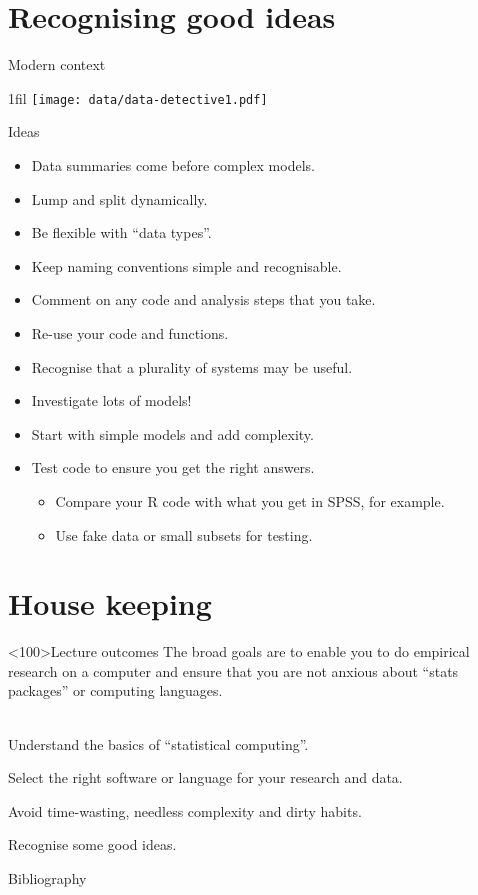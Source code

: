 \documentclass{beamer}
\makeatletter
\newcommand*{\centerfloat}{%
	\parindent \z@
	\leftskip \z@ \@plus 1fil \@minus \textwidth
	\rightskip\leftskip
	\parfillskip \z@skip}
\theoremstyle{example}
\newenvironment{bigenumerate}{\enumerate\addtolength{\itemsep}{1em}}{\endenumerate}
\newcommand{\outcomes}{	The broad goals are to enable you to do empirical research on a computer and ensure that you are not anxious about ``stats packages'' or computing languages.
	\\~\\
	\begin{bigenumerate}
		\item<+-> Understand the basics of ``statistical computing''.
		\item<+-> Select the right software or language for your research and data.
		\item<+-> Avoid time-wasting, needless complexity and dirty habits.
		\item<+-> Recognise some good ideas.
	\end{bigenumerate}
}
\makeatother
\begin{document}
	

	
	
	\section{Recognising good ideas}
	
	\begin{frame}{Modern context \citep[page 14]{spiegelhalter2019} }
		
		\centerfloat \centering	
		\texttt{[image: data/data-detective1.pdf]}
		
	\end{frame}
	
	
	\begin{frame}{Ideas}
		
		\begin{itemize}
			\item<+-> Data summaries come before complex models.
			
			\item<+-> Lump and split dynamically.  
			
			\item<+-> Be flexible with ``data types''.
			
			\item<+-> Keep naming conventions simple and recognisable.
			
			\item<+-> Comment on any code and analysis steps that you take.
			
			\item<+-> Re-use your code and functions.
			
			\item<+-> Recognise that a plurality of systems may be useful.
			
			\item<+-> Investigate lots of models!
			
			\item<+-> Start with simple models and  add complexity.
			
			\item<+-> Test code to ensure you get the right answers.  
			\begin{itemize}
				\item Compare your R code with what you get in SPSS, for example.
				\item Use fake data or small subsets for testing.
			\end{itemize}
			
		\end{itemize}
	\end{frame}
	
	
	
	
	
	
	\section*{House keeping}
	
	
	\begin{frame}<100>{Lecture outcomes}
		\outcomes
	\end{frame}
	
	
	
	
	
	
	
	
	
	\begin{frame}[allowframebreaks]{Bibliography}
		
		
	\end{frame}
	
\end{document}
